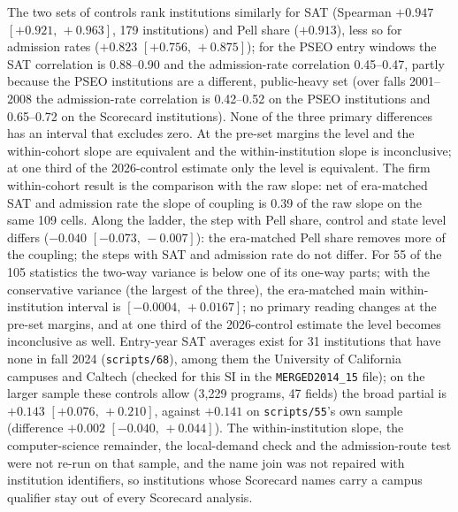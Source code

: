 \documentclass[11pt]{article}
\newcommand{\ci}[2]{$[#1,\allowbreak\,#2]$}
\newcommand{\scr}[1]{\texttt{scripts/#1}}
\begin{document}
The two sets of controls rank institutions similarly for SAT (Spearman $+0.947$ \ci{+0.921}{+0.963}, 179
institutions) and Pell share ($+0.913$), less so for admission rates ($+0.823$ \ci{+0.756}{+0.875}); for the PSEO
entry windows the SAT correlation is 0.88--0.90 and the admission-rate correlation 0.45--0.47, partly because the
PSEO institutions are a different, public-heavy set (over falls 2001--2008 the admission-rate correlation is
0.42--0.52 on the PSEO institutions and 0.65--0.72 on the Scorecard institutions). None of the three primary
differences has an interval that excludes zero. At the pre-set margins the level and the within-cohort slope are
equivalent and the within-institution slope is inconclusive; at one third of the 2026-control estimate only the
level is equivalent. The firm within-cohort result is the comparison with the raw slope: net of era-matched SAT and
admission rate the slope of coupling is 0.39 of the raw slope on the same 109 cells. Along the ladder, the step
with Pell share, control and state level differs ($-0.040$ \ci{-0.073}{-0.007}): the era-matched Pell share removes
more of the coupling; the steps with SAT and admission rate do not differ. For 55 of the 105 statistics the two-way
variance is below one of its one-way parts; with the conservative variance (the largest of the three), the
era-matched main within-institution interval is \ci{-0.0004}{+0.0167}; no primary reading changes at the pre-set
margins, and at one third of the 2026-control estimate the level becomes inconclusive as well. Entry-year SAT
averages exist for 31 institutions that have none in fall 2024 (\scr{68}), among them the University of California
campuses and Caltech (checked for this SI in the \texttt{MERGED2014\_15} file); on the larger sample these controls allow (3,229 programs, 47 fields) the broad partial
is $+0.143$ \ci{+0.076}{+0.210}, against $+0.141$ on \scr{55}'s own sample (difference $+0.002$ \ci{-0.040}{+0.044}).
The within-institution slope, the computer-science remainder, the local-demand check and the admission-route test
were not re-run on that sample, and the name join was not repaired with institution identifiers, so institutions
whose Scorecard names carry a campus qualifier stay out of every Scorecard analysis.
\end{document}
